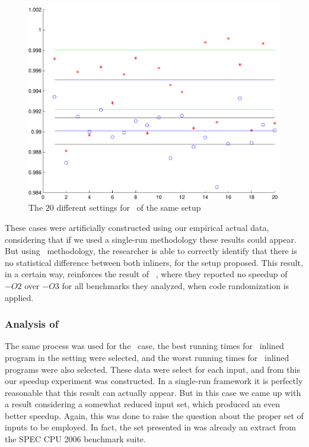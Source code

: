 \begin{figure}
  \centering
  \includegraphics[width=1.00\linewidth]{Figures/gzipfdll}
  \caption{The $20$ different settings for \gzip\ of the same setup}
  \label{fig:gzipfdll}
\end{figure}

These cases were artificially constructed using our empirical actual data, considering that if we used a single-run methodology these results could appear. But using \CP\ methodology, the researcher is able to correctly identify that there is no statistical difference between both inliners, for the setup proposed. This result, in a certain way, reinforces the result of ~\cite{Curtsinger2013}, where they reported no speedup of $-O2$ over $-O3$ for all benchmarks they analyzed, when code randomization is applied.


\subsubsection{Analysis of \gcc}

The same process was used for the \gcc\ case, the best running times for \FDI\ inlined program in the setting were selected, and the worst running times for \llvm\ inlined programs were also selected. These data were select for each input, and from this our speedup experiment was constructed. In a single-run framework it is perfectly reasonable that this result can actually appear. But in this case we came up with a result considering a somewhat reduced input set, which produced an even better speedup. Again, this was done to raise the question about the proper set of inputs to be employed. In fact, the set presented in  was already an extract from the SPEC CPU 2006 benchmark suite.

